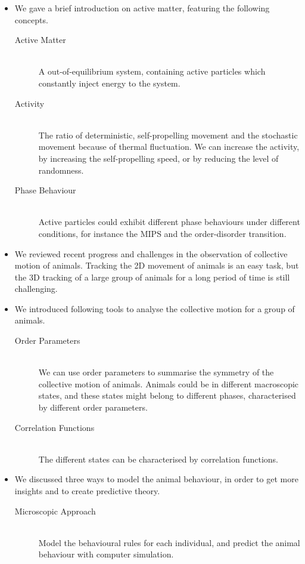 \documentclass[11pt,twoside]{report}
\begin{document}
\begin{adjustwidth}{0cm}{-5cm}
\begin{tcolorbox}[
fonttitle=\sffamily\Large,
right=0.1\linewidth,
top=5mm,
bottom=5mm,
title=Summary of Chapter 2,
]
\begin{itemize}
	\item We gave a brief introduction on active matter, featuring the following concepts.
	\begin{description}
		\item[Active Matter] \hfill \\ 
		A out-of-equilibrium system, containing active particles which constantly inject energy to the system.
		\item[Activity] \hfill \\ 
		The ratio of deterministic, self-propelling movement and the stochastic movement because of thermal fluctuation. We can increase the activity, by increasing the self-propelling speed, or by reducing the level of randomness.
		\item[Phase Behaviour] \hfill \\
		Active particles could exhibit different phase behaviours under different conditions, for instance the MIPS and the order-disorder transition.
	\end{description}
	\item We reviewed recent progress and challenges in the observation of collective motion of animals. Tracking the 2D movement of animals is an easy task, but the 3D tracking of a large group of animals for a long period of time is still challenging.
	\item We introduced following tools to analyse the collective motion for a group of animals.
	\begin{description}
		\item[Order Parameters]\hfill \\ 
			We can use order parameters to summarise the symmetry of the collective motion of animals.
			Animals could be in different macroscopic states, and these states might belong to different phases, characterised by different order parameters.
		\item[Correlation Functions]\hfill \\
			The different states can be characterised by correlation functions.
	\end{description}
	\item We discussed three ways to model the animal behaviour, in order to get more insights and to create predictive theory.
		\begin{description}
		\item[Microscopic Approach]\hfill \\ 
			Model the behavioural rules for each individual, and predict the animal behaviour with computer simulation.

\end{description}
\end{itemize}
\end{tcolorbox}
\end{adjustwidth}
\end{document}
